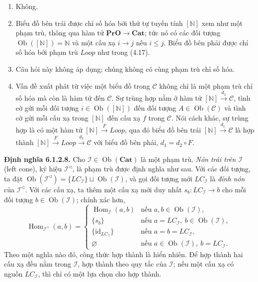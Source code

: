 \begin{enumerate}[label=\alph*.]
\item Không.
\item Biểu đồ bên trái được chỉ số hóa bởi thứ tự tuyến tính $[\mathbb N]$ xem như một phạm trù, thông qua hàm tử $\mathbf{PrO}\to\mathbf{Cat}$; tức nó có các đối tượng $\operatorname{Ob}([\mathbb N])=\mathbb N$ và một cấu xạ $i\to j$ nếu $i\le j$. Biểu đồ bên phải được chỉ số hóa bởi phạm trù $\mathit{Loop}$ như trong (4.17).
\item Câu hỏi này không áp dụng; chúng không có cùng phạm trù chỉ số hóa.
\item Vấn đề xuất phát từ việc một biểu đồ trong $\mathcal C$ không chỉ là một phạm trù chỉ số hóa mà còn là hàm tử đến $\mathcal C$. Sự trùng hợp nằm ở hàm tử $[\mathbb N]\xrightarrow{d_1}\mathcal C$, tình cờ gửi mỗi đối tượng $i\in\operatorname{Ob}([\mathbb N])$ đến đối tượng $A\in\operatorname{Ob}(\mathcal C)$ và tình cờ gửi mỗi cấu xạ trong $[\mathbb N]$ đến cấu xạ $f$ trong $\mathcal C$. Nói cách khác, sự trùng hợp là có một hàm tử $[\mathbb N]\xrightarrow F\mathit{Loop}$, qua đó biểu đồ bên trái $[\mathbb N]\xrightarrow{d_1}\mathcal C$ là hợp thành $[\mathbb N]\xrightarrow F\mathit{Loop}\xrightarrow{d_2}\mathcal C$ với biểu đồ bên phải, $d_1=d_2\circ F$.
\end{enumerate}

\noindent\textbf{Định nghĩa 6.1.2.8.} Cho $\mathcal I\in\operatorname{Ob}(\mathbf{Cat})$ là một phạm trù. \emph{Nón trái trên $\mathcal I$} (left cone), ký hiệu $\mathcal I^{\triangleleft}$, là phạm trù được định nghĩa như sau. Với các đối tượng, ta đặt $\operatorname{Ob}(\mathcal I^{\triangleleft})=\{LC_{\mathcal I}\}\sqcup\operatorname{Ob}(\mathcal I)$, và gọi đối tượng mới $LC_{\mathcal I}$ là \emph{đỉnh nón} của $\mathcal I^{\triangleleft}$. Với các cấu xạ, ta thêm một cấu xạ mới duy nhất $s_b:LC_{\mathcal I}\to b$ cho mỗi đối tượng $b\in\operatorname{Ob}(\mathcal I)$; chính xác hơn,
\[\operatorname{Hom}_{\mathcal I^{\triangleleft}}(a,b)=\begin{cases}
\operatorname{Hom}_{\mathcal I}(a,b)&\text{nếu }a,b\in\operatorname{Ob}(\mathcal I),\\
\{s_b\}&\text{nếu }a=LC_{\mathcal I},\ b\in\operatorname{Ob}(\mathcal I),\\
\{\mathrm{id}_{LC_{\mathcal I}}\}&\text{nếu }a=b=LC_{\mathcal I},\\
\varnothing&\text{nếu }a\in\operatorname{Ob}(\mathcal I),\ b=LC_{\mathcal I}.
\end{cases}\]
Theo một nghĩa nào đó, công thức hợp thành là hiển nhiên. Để hợp thành hai cấu xạ đều nằm trong $\mathcal I$, hợp thành theo quy tắc của $\mathcal I$; nếu một cấu xạ có nguồn $LC_{\mathcal I}$, thì chỉ có một lựa chọn cho hợp thành.

